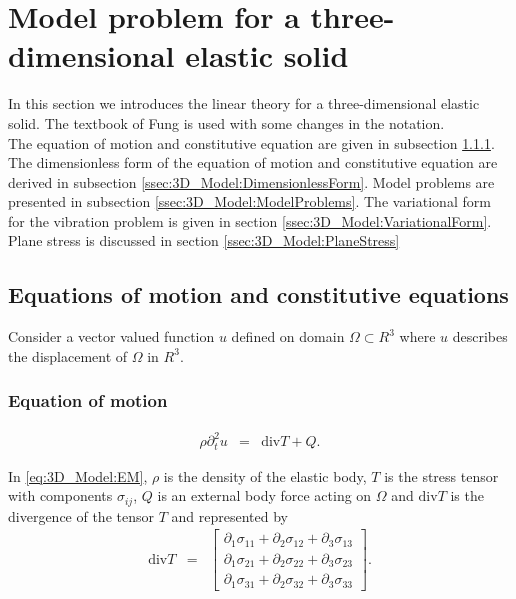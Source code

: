 \documentclass[../../main.tex]{subfiles}
\begin{document}
\section{Model problem for a three-dimensional elastic solid} \label{sec:3D_Model}
In this section we introduces the linear theory for a three-dimensional elastic
solid. The textbook of Fung \cite{Fung65} is used with some changes in the
notation. \\

The equation of motion and constitutive equation are given in subsection
\ref{ssec:3D_Model:EquationOfMotion}. The dimensionless form of the equation of
motion and constitutive equation are derived in subsection
\ref{ssec:3D_Model:DimensionlessForm}. Model problems are presented in
subsection \ref{ssec:3D_Model:ModelProblems}. The variational form for the
vibration problem is given in section \ref{ssec:3D_Model:VariationalForm}.
Plane stress is discussed in section \ref{ssec:3D_Model:PlaneStress}

\subsection{Equations of motion and constitutive equations} \label{ssec:3D_Model:EquationofMotion+ConstitutiveEquation}
Consider a vector valued function $u$ defined on domain $\Omega \subset {R}^3$
where $u$ describes the displacement of $\Omega$ in ${R}^3$.
\subsubsection{Equation of motion}\label{ssec:3D_Model:EquationOfMotion}
\begin{eqnarray}
	\rho\partial_t^2 u & = & \textrm{div}T + Q. \label{eq:3D_Model:EM}
\end{eqnarray}

In \eqref{eq:3D_Model:EM}, $\rho$ is the density of the elastic body, $T$ is
the stress tensor with components $\sigma_{ij}$, $Q$ is an external body force
acting on $\Omega$ and $\textrm{div}T$ is the divergence of the tensor $T$ and
represented by
\begin{eqnarray}
	\textrm{div}  T & = &
	\begin{bmatrix}
		\partial_1 \sigma_{11} + \partial_2 \sigma_{12} + \partial_3 \sigma_{13} \\
		\partial_1 \sigma_{21} + \partial_2 \sigma_{22} + \partial_3 \sigma_{23} \\
		\partial_1 \sigma_{31} + \partial_2 \sigma_{32} + \partial_3 \sigma_{33}
	\end{bmatrix}. \label{eq:3D_Model:divT}
\end{eqnarray}
\end{document}
